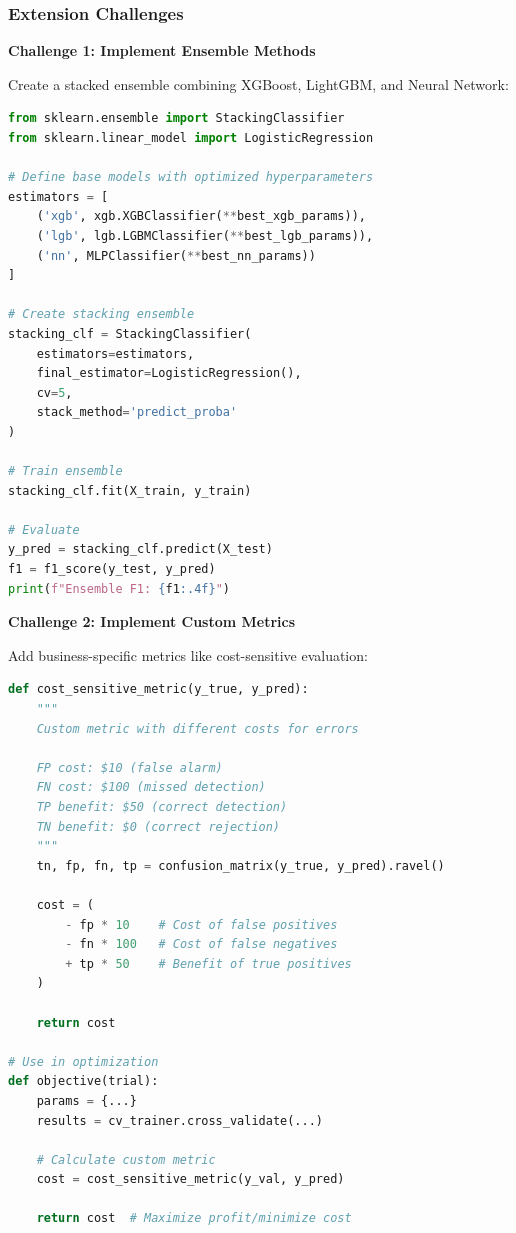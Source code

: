 \subsubsection{Extension Challenges}

\textbf{Challenge 1: Implement Ensemble Methods}

Create a stacked ensemble combining XGBoost, LightGBM, and Neural Network:

\begin{lstlisting}[language=Python]
from sklearn.ensemble import StackingClassifier
from sklearn.linear_model import LogisticRegression

# Define base models with optimized hyperparameters
estimators = [
    ('xgb', xgb.XGBClassifier(**best_xgb_params)),
    ('lgb', lgb.LGBMClassifier(**best_lgb_params)),
    ('nn', MLPClassifier(**best_nn_params))
]

# Create stacking ensemble
stacking_clf = StackingClassifier(
    estimators=estimators,
    final_estimator=LogisticRegression(),
    cv=5,
    stack_method='predict_proba'
)

# Train ensemble
stacking_clf.fit(X_train, y_train)

# Evaluate
y_pred = stacking_clf.predict(X_test)
f1 = f1_score(y_test, y_pred)
print(f"Ensemble F1: {f1:.4f}")
\end{lstlisting}

\textbf{Challenge 2: Implement Custom Metrics}

Add business-specific metrics like cost-sensitive evaluation:

\begin{lstlisting}[language=Python]
def cost_sensitive_metric(y_true, y_pred):
    """
    Custom metric with different costs for errors

    FP cost: $10 (false alarm)
    FN cost: $100 (missed detection)
    TP benefit: $50 (correct detection)
    TN benefit: $0 (correct rejection)
    """
    tn, fp, fn, tp = confusion_matrix(y_true, y_pred).ravel()

    cost = (
        - fp * 10    # Cost of false positives
        - fn * 100   # Cost of false negatives
        + tp * 50    # Benefit of true positives
    )

    return cost

# Use in optimization
def objective(trial):
    params = {...}
    results = cv_trainer.cross_validate(...)

    # Calculate custom metric
    cost = cost_sensitive_metric(y_val, y_pred)

    return cost  # Maximize profit/minimize cost
\end{lstlisting}

